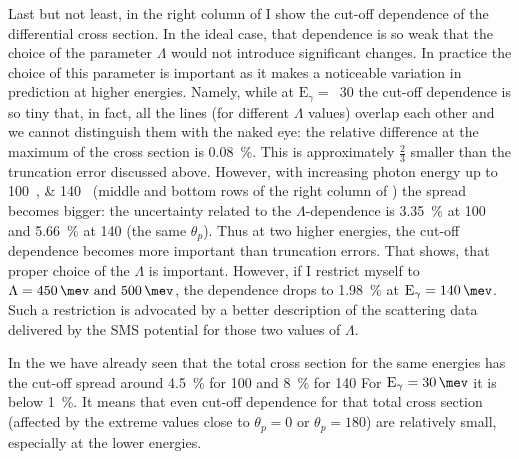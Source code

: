     Last but not least, in the right column of 
    I show the cut-off dependence of the differential cross section.
    In the ideal case, that dependence is so weak that
    the choice of the parameter $\Lambda$ would not introduce significant 
    changes. In practice the choice of this parameter is 
    important as it makes a noticeable variation in prediction at higher energies.
    Namely, while at $\text{E}_\gamma=$~\SI{30}{\mev} the cut-off dependence is so tiny
    that, in fact, all the lines (for different $\Lambda$ values)
    overlap each other and we cannot distinguish them with the naked eye:
    the relative difference at the maximum of the cross section is \SI{0.08}{\percent}.
    This is approximately $\frac{2}{3}$ smaller than the truncation error discussed above.
    However, with increasing photon energy up to \SIlist{100; 140}{\mev} 
    (middle and bottom rows of the right column of ) the spread becomes bigger:
    the  uncertainty related to the 
    $\Lambda$-dependence is  \SI{3.35}{\percent} at \SI{100}{\mev}
    and \SI{5.66}{\percent} at \SI{140}{\mev} (the same $\theta_p$).
    Thus at two higher energies, the cut-off dependence becomes more important
    than truncation errors.
    That shows, that proper choice of the $\Lambda$ is important.
    However, if I restrict myself to $\Lambda=\SIlist{450;500}{\mev}$,
    the dependence drops to \SI{1.98}{\percent} at $\text{E}_\gamma=\SI{140}{\mev}$.
    Such a restriction is advocated by a better description of the scattering data
    delivered by the SMS potential for those two values of $\Lambda$.

    In the  we have already seen that the total
    cross section for the same energies has the cut-off spread
    around \SI{4.5}{\percent} for \SI{100}{\mev} and \SI{8}{\percent} for \SI{140}{\mev}
     For $\text{E}_\gamma=\SI{30}{\mev}$ it is below  \SI{1}{\percent}.
     It means that even cut-off dependence for that total cross section (affected
     by the extreme values close to $\theta_p = 0$ or $\theta_p = 180$)  are
     relatively small, especially at the lower energies.


